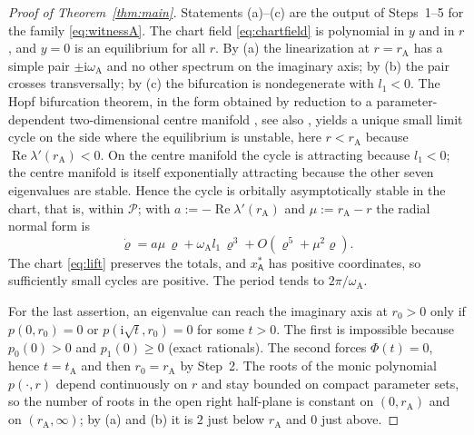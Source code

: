\documentclass[11pt,a4paper]{article}
\theoremstyle{plain}
\theoremstyle{definition}
\theoremstyle{remark}
\newcommand{\ii}{\mathrm i}
\newcommand{\cP}{\mathcal P}
\newcommand{\rA}{r_{\mathrm A}}
\newcommand{\omA}{\omega_{\mathrm A}}
\newcommand{\WA}{\mathsf A}
\DeclareMathOperator{\Ree}{Re}
\begin{document}
\begin{proof}[Proof of Theorem~\ref{thm:main}]
Statements (a)--(c) are the output of Steps~1--5 for the family \eqref{eq:witnessA}. The chart field \eqref{eq:chartfield} is polynomial in $y$ and in $r$, and $y=0$ is an equilibrium for all $r$. By (a) the linearization at $r=\rA$ has a simple pair $\pm\ii\omA$ and no other spectrum on the imaginary axis; by (b) the pair crosses transversally; by (c) the bifurcation is nondegenerate with $l_1<0$. The Hopf bifurcation theorem, in the form obtained by reduction to a parameter-dependent two-dimensional centre manifold \cite[Sections~3.5 and~5.4]{Kuznetsov23}, see also \cite{HassardKazarinoffWan81,MarsdenMcCracken76}, yields a unique small limit cycle on the side where the equilibrium is unstable, here $r<\rA$ because $\Ree\lambda'(\rA)<0$. On the centre manifold the cycle is attracting because $l_1<0$; the centre manifold is itself exponentially attracting because the other seven eigenvalues are stable. Hence the cycle is orbitally asymptotically stable in the chart, that is, within $\cP$; with $a:=-\Ree\lambda'(\rA)$ and $\mu:=\rA-r$ the radial normal form is
\begin{equation}\label{eq:radial}
 \dot\varrho=a\mu\,\varrho+\omA l_1\,\varrho^3+O(\varrho^5+\mu^2\varrho) .
\end{equation}
The chart \eqref{eq:lift} preserves the totals, and $x^*_{\WA}$ has positive coordinates, so sufficiently small cycles are positive. The period tends to $2\pi/\omA$.

For the last assertion, an eigenvalue can reach the imaginary axis at $r_0>0$ only if $p(0,r_0)=0$ or $p(\ii\sqrt t,r_0)=0$ for some $t>0$. The first is impossible because $p_0(0)>0$ and $p_1(0)\ge0$ (exact rationals). The second forces $\Phi(t)=0$, hence $t=t_{\mathrm A}$ and then $r_0=\rA$ by Step~2. The roots of the monic polynomial $p(\cdot,r)$ depend continuously on $r$ and stay bounded on compact parameter sets, so the number of roots in the open right half-plane is constant on $(0,\rA)$ and on $(\rA,\infty)$; by (a) and (b) it is $2$ just below $\rA$ and $0$ just above.
\end{proof}
\end{document}
